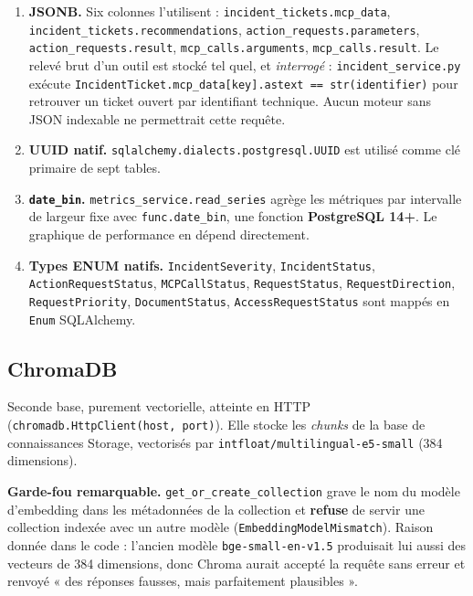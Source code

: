 \documentclass[11pt,a4paper]{report}
\newcommand{\file}[1]{\texttt{\small #1}}
\newcommand{\fn}[1]{\texttt{\small\textcolor{oasisviolet}{#1}}}
\newcommand{\cls}[1]{\texttt{\small\textcolor{oasisblue}{#1}}}
\newcommand{\tbl}[1]{\texttt{\small\textcolor{oasisamber}{#1}}}
\begin{document}
\begin{enumerate}
  \item \textbf{JSONB.} Six colonnes l'utilisent :
  \tbl{incident\_tickets.mcp\_data}, \tbl{incident\_tickets.recommendations},
  \tbl{action\_requests.parameters}, \tbl{action\_requests.result},
  \tbl{mcp\_calls.arguments}, \tbl{mcp\_calls.result}. Le relevé brut d'un outil
  est stocké tel quel, et \emph{interrogé} : \file{incident\_service.py} exécute
  \texttt{IncidentTicket.mcp\_data[key].astext == str(identifier)} pour retrouver
  un ticket ouvert par identifiant technique. Aucun moteur sans JSON indexable ne
  permettrait cette requête.

  \item \textbf{UUID natif.} \texttt{sqlalchemy.dialects.postgresql.UUID} est
  utilisé comme clé primaire de sept tables.

  \item \textbf{\texttt{date\_bin}.} \file{metrics\_service.read\_series} agrège
  les métriques par intervalle de largeur fixe avec \fn{func.date\_bin}, une
  fonction \textbf{PostgreSQL 14+}. Le graphique de performance en dépend
  directement.

  \item \textbf{Types ENUM natifs.} \texttt{IncidentSeverity},
  \texttt{IncidentStatus}, \texttt{ActionRequestStatus}, \texttt{MCPCallStatus},
  \texttt{RequestStatus}, \texttt{RequestDirection}, \texttt{RequestPriority},
  \texttt{DocumentStatus}, \texttt{AccessRequestStatus} sont mappés en
  \texttt{Enum} SQLAlchemy.
\end{enumerate}

\subsection{ChromaDB}

Seconde base, purement vectorielle, atteinte en HTTP
(\fn{chromadb.HttpClient(host, port)}). Elle stocke les \emph{chunks} de la base
de connaissances Storage, vectorisés par \texttt{intfloat/multilingual-e5-small}
(384 dimensions).

\begin{keybox}
\textbf{Garde-fou remarquable.} \fn{get\_or\_create\_collection} grave le nom du
modèle d'embedding dans les métadonnées de la collection et \textbf{refuse} de
servir une collection indexée avec un autre modèle
(\cls{EmbeddingModelMismatch}). Raison donnée dans le code : l'ancien modèle
\texttt{bge-small-en-v1.5} produisait lui aussi des vecteurs de 384 dimensions,
donc Chroma aurait accepté la requête sans erreur et renvoyé « des réponses
fausses, mais parfaitement plausibles ».
\end{keybox}
\end{document}
